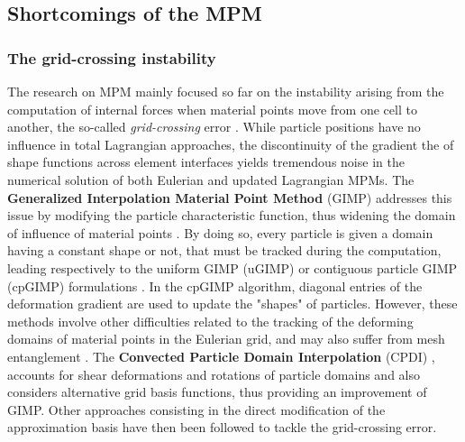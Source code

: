 \subsection{Shortcomings of the MPM}
\subsubsection*{The grid-crossing instability}
The research on MPM mainly focused so far on the instability arising from the computation of internal forces when material points move from one cell to another, the so-called \textit{grid-crossing} error \cite{Gimp}.
While particle positions have no influence in total Lagrangian approaches, the discontinuity of the gradient the of shape functions across element interfaces yields tremendous noise in the numerical solution of both Eulerian and updated Lagrangian MPMs. 
The \textbf{Generalized Interpolation Material Point Method} (GIMP) addresses this issue by modifying the particle characteristic function, thus widening the domain of influence of material points \cite{Gimp}.
By doing so, every particle is given a domain having a constant shape or not, that must be tracked during the computation, leading respectively to the uniform GIMP (uGIMP) or contiguous particle GIMP (cpGIMP) formulations \cite{Book_MPM}.
In the cpGIMP algorithm, diagonal entries of the deformation gradient are used to update the "shapes" of particles.
However, these methods involve other difficulties related to the tracking of the deforming domains of material points in the Eulerian grid, and may also suffer from mesh entanglement \cite{DDMPM0}.
The \textbf{Convected Particle Domain Interpolation} (CPDI) \cite{CPDI}, accounts for shear deformations and rotations of particle domains and also considers alternative grid basis functions, thus providing an improvement of GIMP.
Other approaches consisting in the direct modification of the approximation basis have then been followed to tackle the grid-crossing error.
